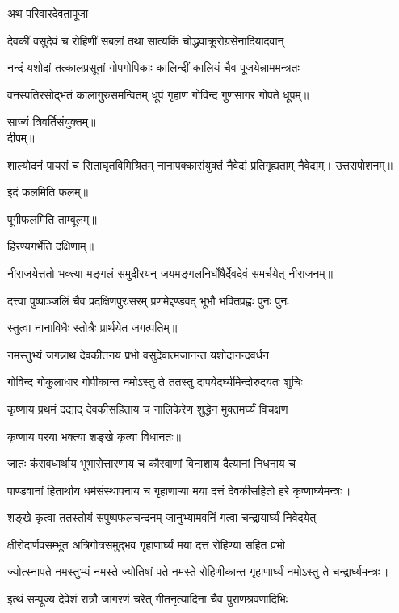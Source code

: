अथ परिवारदेवतापूजा—

\twolineshloka
{देवकीं वसुदेवं च रोहिणीं सबलां तथा}
{सात्यकिं चोद्धवाक्रूरोग्रसेनादियादवान्}

\twolineshloka
{नन्दं यशोदां तत्कालप्रसूतां गोपगोपिकाः}
{कालिन्दीं कालियं चैव पूजयेन्नाममन्त्रतः}

\twolineshloka
{वनस्पतिरसोद्भतं कालागुरुसमन्वितम्}
{धूपं गृहाण गोविन्द गुणसागर गोपते}
धूपम्॥

साज्यं त्रिवर्तिसंयुक्तम्॥\\
दीपम्॥

\twolineshloka
{शाल्योदनं पायसं च सिताघृतविमिश्रितम्}
{नानापक्कासंयुक्तं नैवेद्यं प्रतिगृह्यताम्}
नैवेद्यम्।
उत्तरापोशनम्॥

इदं फलमिति फलम्॥

पूगीफलमिति ताम्बूलम्॥

हिरण्यगर्भेति दक्षिणाम्॥

\twolineshloka
{नीराजयेत्ततो भक्त्या मङ्गलं समुदीरयन्}
{जयमङ्गलनिर्घोषैर्देवदेवं समर्चयेत्}
नीराजनम्॥


\twolineshloka
{दत्त्वा पुष्पाञ्जलिं चैव प्रदक्षिणपुरःसरम्}
{प्रणमेद्दण्डवद् भूभौ भक्तिप्रह्वः पुनः पुनः}

स्तुत्वा नानाविधैः स्तोत्रैः प्रार्थयेत जगत्पतिम्॥

\twolineshloka
{नमस्तुभ्यं जगन्नाथ देवकीतनय प्रभो}
{वसुदेवात्मजानन्त यशोदानन्दवर्धन}

\twolineshloka
{गोविन्द गोकुलाधार गोपीकान्त नमोऽस्तु ते}
{ततस्तु दापयेदर्घ्यमिन्दोरुदयतः शुचिः}

\twolineshloka
{कृष्णाय प्रथमं दद्याद् देवकीसहिताय च}
{नालिकेरेण शुद्धेन मुक्तमर्घ्यं विचक्षण}

कृष्णाय परया भक्त्या शङ्खे कृत्वा विधानतः॥

\twolineshloka
{जातः कंसवधार्थाय भूभारोत्तारणाय च}
{कौरवाणां विनाशाय दैत्यानां निधनाय च}

\twolineshloka
{पाण्डवानां हितार्थाय धर्मसंस्थापनाय च}
{गृहाणाऱ्या मया दत्तं देवकीसहितो हरे}
कृष्णार्घ्यमन्त्रः॥

\twolineshloka
{शङ्खे कृत्वा ततस्तोयं सपुष्पफलचन्दनम्}
{जानुभ्यामवनिं गत्वा चन्द्रायार्घ्यं निवेदयेत्}

\twolineshloka
{क्षीरोदार्णवसम्भूत अत्रिगोत्रसमुद्भव}
{गृहाणार्घ्यं मया दत्तं रोहिण्या सहित प्रभो}

\twolineshloka
{ज्योत्स्नापते नमस्तुभ्यं नमस्ते ज्योतिषां पते}
{नमस्ते रोहिणीकान्त गृहाणार्घ्यं नमोऽस्तु ते}
चन्द्रार्घ्यमन्त्रः॥

\twolineshloka
{इत्थं सम्पूज्य देवेशं रात्रौ जागरणं चरेत्}
{गीतनृत्यादिना चैव पुराणश्रवणादिभिः}

